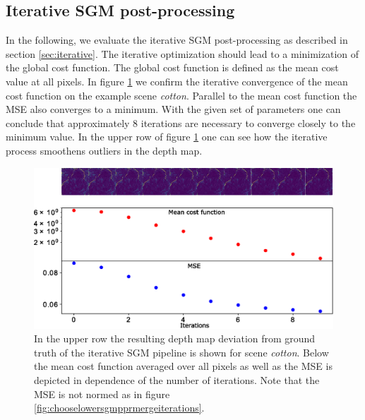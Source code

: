 \documentclass  [
  paper    = a4,
  BCOR     = 10mm,
  twoside,
  fontsize = 12pt,
  fleqn,
  toc      = bibnumbered,
  toc      = listofnumbered,
  numbers  = noendperiod,
  headings = normal,
  listof   = leveldown,
  version  = 3.03
]                                       {scrreprt}
\begin{document}
\subsection{Iterative SGM post-processing}
In the following, we evaluate the iterative SGM post-processing as described in section \ref{sec:iterative}. The iterative optimization should lead to a minimization of the global cost function. The global cost function is defined as the mean cost value at all pixels. In figure \ref{fig:iterationcostcotton} we confirm the iterative convergence of the mean cost function on the example scene \textit{cotton}. Parallel to the mean cost function the MSE also converges to a minimum. With the given set of parameters one can conclude that approximately 8 iterations are necessary to converge closely to the minimum value. In the upper row of figure \ref{fig:iterationcostcotton} one can see how the iterative process smoothens outliers in the depth map.\\
\begin{figure}[h!]
	\centering
	\includegraphics[width=1\linewidth]{images/iteration_cost_cotton}
	\caption[Iterative improvement of scene \textit{cotton}]{In the upper row the resulting depth map deviation from ground truth of the iterative SGM pipeline is shown for scene \textit{cotton}. Below the mean cost function averaged over all pixels as well as the MSE is depicted in dependence of the number of iterations. Note that the MSE is not normed as in figure \ref{fig:chooselowersgmpprmergeiterations}.}
	\label{fig:iterationcostcotton}
\end{figure}
\end{document}
